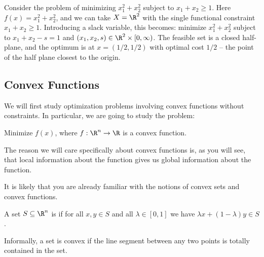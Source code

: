 \begin{example}
    Consider the problem of minimizing $x_1^2 + x_2^2$ subject to $x_1 + x_2 \geq 1$. Here $f(x) = x_1^2 + x_2^2$, and we can take $X = \R^2$ with the single functional constraint $x_1 + x_2 \geq 1$. Introducing a slack variable, this becomes: minimize $x_1^2 + x_2^2$ subject to $x_1 + x_2 - s = 1$ and $(x_1, x_2, s) \in \R^2 \times [0, \infty)$. The feasible set is a closed half-plane, and the optimum is at $x = (1/2, 1/2)$ with optimal cost $1/2$ -- the point of the half plane closest to the origin.
\end{example}

\subsection{Convex Functions}

We will first study optimization problems involving convex functions without constraints. In particular, we are going to study the problem:
\begin{center}
    Minimize $f(x)$, where $f : \R^n \rightarrow \R$ is a convex function.
\end{center}
The reason we will care specifically about convex functions is, as you will see, that local information about the function gives us global information about the function.

It is likely that you are already familiar with the notions of convex sets and convex functions.

\begin{definition}
    A set $S \subseteq \R^n$ is  if for all $x, y \in S$ and all $\lambda \in [0, 1]$ we have $\lambda x + (1 - \lambda) y \in S$.
\end{definition}

Informally, a set is convex if the line segment between any two points is totally contained in the set.

\begin{center}
\end{center}

